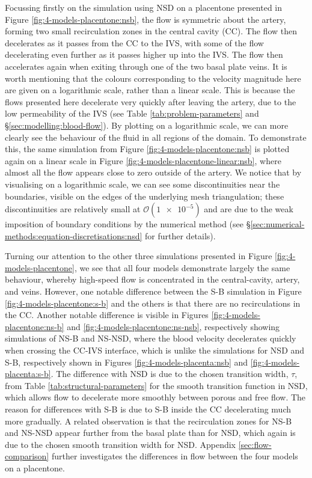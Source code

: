             Focussing firstly on the simulation using NSD on a placentone presented in Figure \ref{fig:4-models-placentone:nsb}, the flow is symmetric about the artery, forming two small recirculation zones in the central cavity (CC). The flow then decelerates as it passes from the CC to the IVS, with some of the flow decelerating even further as it passes higher up into the IVS. The flow then accelerates again when exiting through one of the two basal plate veins. It is worth mentioning that the colours corresponding to the velocity magnitude here are given on a logarithmic scale, rather than a linear scale. This is because the flows presented here decelerate very quickly after leaving the artery, due to the low permeability of the IVS (see Table \ref{tab:problem-parameters} and \S\ref{sec:modelling:blood-flow}). By plotting on a logarithmic scale, we can more clearly see the behaviour of the fluid in all regions of the domain. To demonstrate this, the same simulation from Figure \ref{fig:4-models-placentone:nsb} is plotted again on a linear scale in Figure \ref{fig:4-models-placentone-linear:nsb}, where almost all the flow appears close to zero outside of the artery. We notice that by visualising on a logarithmic scale, we can see some discontinuities near the boundaries, visible on the edges of the underlying mesh triangulation; these discontinuities are relatively small at $\mathcal{O}(\num{1e-5})$ and are due to the weak imposition of boundary conditions by the numerical method (see \S\ref{sec:numerical-methods:equation-discretisations:nsd} for further details).
    
            Turning our attention to the other three simulations presented in Figure \ref{fig:4-models-placentone}, we see that all four models demonstrate largely the same behaviour, whereby high-speed flow is concentrated in the central-cavity, artery, and veins. However, one notable difference between the S-B simulation in Figure \ref{fig:4-models-placentone:s-b} and the others is that there are no recirculations in the CC. Another notable difference is visible in Figures \ref{fig:4-models-placentone:ns-b} and \ref{fig:4-models-placentone:ns-nsb}, respectively showing simulations of NS-B and NS-NSD, where the blood velocity decelerates quickly when crossing the CC-IVS interface, which is unlike the simulations for NSD and S-B, respectively shown in Figures \ref{fig:4-models-placenta:nsb} and \ref{fig:4-models-placenta:s-b}. The difference with NSD is due to the chosen transition width, $\tau$, from Table \ref{tab:structural-parameters} for the smooth transition function in NSD, which allows flow to decelerate more smoothly between porous and free flow. The reason for differences with S-B is due to S-B inside the CC decelerating much more gradually. A related observation is that the recirculation zones for NS-B and NS-NSD appear further from the basal plate than for NSD, which again is due to the chosen smooth transition width for NSD. Appendix \ref{sec:flow-comparison} further investigates the differences in flow between the four models on a placentone.
            
